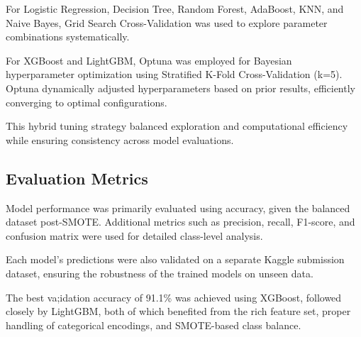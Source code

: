 For Logistic Regression, Decision Tree, Random Forest, AdaBoost, KNN, and Naive Bayes, Grid Search Cross-Validation was used to explore parameter combinations systematically.

For XGBoost and LightGBM, Optuna was employed for Bayesian hyperparameter optimization using Stratified K-Fold Cross-Validation (k=5).
Optuna dynamically adjusted hyperparameters based on prior results, efficiently converging to optimal configurations.

This hybrid tuning strategy balanced exploration and computational efficiency while ensuring consistency across model evaluations.

\subsection{Evaluation Metrics}\label{subsec:evaluation-metrics}
Model performance was primarily evaluated using accuracy, given the balanced dataset post-SMOTE.
Additional metrics such as precision, recall, F1-score, and confusion matrix were used for detailed class-level analysis.

Each model's predictions were also validated on a separate Kaggle submission dataset, ensuring the robustness of the trained models on unseen data.

The best va;idation accuracy of 91.1\% was achieved using XGBoost, followed closely by LightGBM, both of which benefited from the rich feature set, proper handling of categorical encodings, and SMOTE-based class balance.
